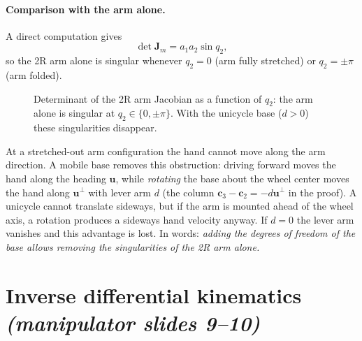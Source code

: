 \documentclass[11pt,a4paper]{article}
\newcommand{\Jarm}{\bm{J}_m}
\theoremstyle{plain}
\theoremstyle{definition}
\theoremstyle{remark}
\begin{document}
\paragraph{Comparison with the arm alone.} A direct computation gives
\[
\det\Jarm=a_1a_2\sin q_2 ,
\]
so the 2R arm alone is singular whenever $q_2=0$ (arm fully stretched) or $q_2=\pm\pi$ (arm folded).

\begin{figure}[ht]
\centering
{}
\caption{Determinant of the 2R arm Jacobian as a function of $q_2$: the arm alone is singular at $q_2\in\{0,\pm\pi\}$. With the unicycle base ($d>0$) these singularities disappear.}
\end{figure}

\begin{intuition}
At a stretched-out arm configuration the hand cannot move along the arm direction. A mobile base removes this obstruction: driving forward moves the hand along the heading $\bm u$, while \emph{rotating} the base about the wheel center moves the hand along $\bm u^\perp$ with lever arm $d$ (the column $\bm c_3-\bm c_2=-d\bm u^\perp$ in the proof). A unicycle cannot translate sideways, but if the arm is mounted ahead of the wheel axis, a rotation produces a sideways hand velocity anyway. If $d=0$ the lever arm vanishes and this advantage is lost. In words: \emph{adding the degrees of freedom of the base allows removing the singularities of the 2R arm alone.}
\end{intuition}

\section{Inverse differential kinematics \emph{(manipulator slides 9--10)}}
\end{document}
